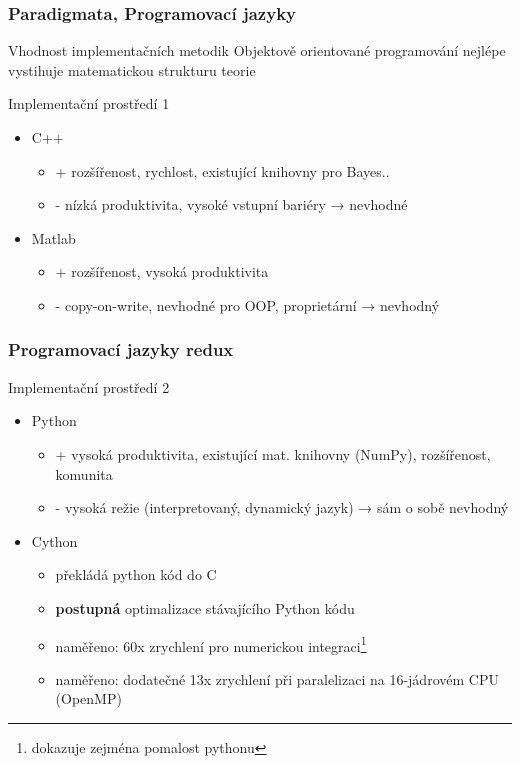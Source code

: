 \documentclass[12pt]{beamer}
\begin{document}
\begin{frame}
	\frametitle{Paradigmata, Programovací jazyky}

	\begin{block}{Vhodnost implementačních metodik}
		Objektově orientované programování nejlépe vystihuje matematickou strukturu teorie
	\end{block}

	\begin{block}{Implementační prostředí 1}
		\begin{itemize}
			\item C++
			\begin{itemize}
				\item + rozšířenost, rychlost, existující knihovny pro Bayes..
				\item - nízká produktivita, vysoké vstupní bariéry → nevhodné
			\end{itemize}
			\item Matlab
			\begin{itemize}
				\item + rozšířenost, vysoká produktivita
				\item - copy-on-write, nevhodné pro OOP, proprietární → nevhodný
			\end{itemize}
		\end{itemize}
	\end{block}
\end{frame}

\begin{frame}
	\frametitle{Programovací jazyky redux}

	\begin{block}{Implementační prostředí 2}
		\begin{itemize}
			\item Python
			\begin{itemize}
				\item + vysoká produktivita, existující mat. knihovny (NumPy), rozšířenost, komunita
				\item - vysoká režie (interpretovaný, dynamický jazyk) → sám o sobě nevhodný
			\end{itemize}
			\item Cython
			\begin{itemize}
				\item překládá python kód do C
				\item \textbf{postupná} optimalizace stávajícího Python kódu
				\item naměřeno: 60x zrychlení pro numerickou integraci\footnote{dokazuje zejména
pomalost pythonu}
				\item naměřeno: dodatečné 13x zrychlení při paralelizaci na 16-jádrovém CPU (OpenMP)
			\end{itemize}
		\end{itemize}
	\end{block}
\end{frame}
\end{document}
